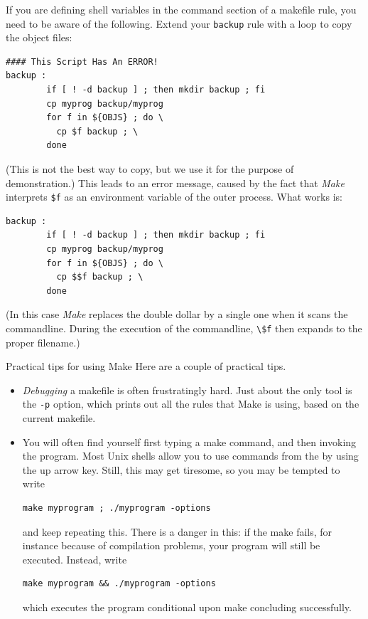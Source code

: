 If you are defining shell variables in the command section of a
makefile rule, you need to be aware of the following. Extend your
\lstinline{backup} rule with a loop to copy the object files:
\begin{lstlisting}
#### This Script Has An ERROR!
backup :
        if [ ! -d backup ] ; then mkdir backup ; fi
        cp myprog backup/myprog
        for f in ${OBJS} ; do \
          cp $f backup ; \
        done
\end{lstlisting}
(This is not the best way to copy, but we use it for the purpose of
demonstration.) This leads to an error message, caused by the fact
that \emph{Make} interprets \verb+$f+ as an environment variable of
the outer process. What works is:
\begin{lstlisting}
backup :
        if [ ! -d backup ] ; then mkdir backup ; fi
        cp myprog backup/myprog
        for f in ${OBJS} ; do \
          cp $$f backup ; \
        done
\end{lstlisting}
(In this case \emph{Make} replaces the double dollar by a single one
when it scans the commandline. During the execution of the
commandline, \lstinline{\$f} then expands to the proper filename.)

\Level 0 {Practical tips for using Make}
Here are a couple of practical tips.

\begin{itemize}
\item \emph{Debugging} a makefile is often
  frustratingly hard.  Just about the only tool is the \lstinline{-p} option,
  which prints out all the rules that Make is using, based on the
  current makefile.
\item You will often find yourself first typing a make command, and
  then invoking the program. Most Unix shells allow you to use
  commands from the \indextermbus{shell}{command history} by using the
  up arrow key. Still, this may get tiresome, so you may be tempted to
  write
\begin{lstlisting}
make myprogram ; ./myprogram -options
\end{lstlisting}
and keep repeating this.
There is a danger in this: if the make fails, for instance because of
compilation problems, your program will still be executed. Instead, write
\begin{lstlisting}
make myprogram && ./myprogram -options
\end{lstlisting}
which executes the program conditional upon make concluding successfully.
\end{itemize}

